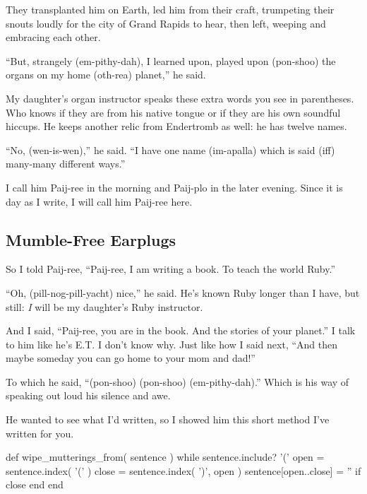 \documentclass[12pt,twoside]{report}
\begin{document}
They transplanted him on Earth, led him from their craft, trumpeting
their snouts loudly for the city of Grand Rapids to hear, then left,
weeping and embracing each other.

``But, strangely (em-pithy-dah), I learned upon, played upon
(pon-shoo) the organs on my home (oth-rea) planet,'' he said.

My daughter's organ instructor speaks these extra words you see in
parentheses.  Who knows if they are from his native tongue or if they
are his own soundful hiccups.  He keeps another relic from Endertromb
as well: he has twelve names.

``No, (wen-is-wen),'' he said.  ``I have one name (im-apalla) which is
said (iff) many-many different ways.''

I call him Paij-ree in the morning and Paij-plo in the later
evening. Since it is day as I write, I will call him Paij-ree here.



\subsection{Mumble-Free Earplugs}




So I told Paij-ree, ``Paij-ree, I am writing a book.  To teach the
world Ruby.''

``Oh, (pill-nog-pill-yacht) nice,'' he said.  He's known Ruby longer
than I have, but still: {\em I} will be my daughter's Ruby instructor.

And I said, ``Paij-ree, you are in the book.  And the stories of your
planet.''  I talk to him like he's E.T.  I don't know why.  Just like
how I said next, ``And then maybe someday you can go home to your mom
and dad!''

To which he said, ``(pon-shoo) (pon-shoo) (em-pithy-dah).''  Which is
his way of speaking out loud his silence and awe.

He wanted to see what I'd written, so I showed him this short method
I've written for you.


\begin{rubycode}

 def wipe_mutterings_from( sentence )
   while sentence.include? '('
     open = sentence.index( '(' )
     close = sentence.index( ')', open )
     sentence[open..close] = '' if close
   end
 end

\end{rubycode}
\end{document}
